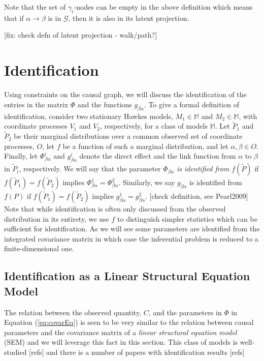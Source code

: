 \documentclass[accepted]{uai2021} %
\begin{document}
Note that the set of $\gamma_i$-nodes can be empty in the above definition 
which means that if $\alpha\rightarrow\beta$ is in $\mathcal{G}$, then it is 
also in its latent projection.

[fix: check defn of latent projection - walk/path?]



\section{Identification}

Using constraints on the causal graph, we will discuss the identification of 
the entries in the 
matrix $\Phi$ and the functions $g_{\beta\alpha}$. To give a formal definition 
of 
identification, consider two stationary Hawkes 
models, $M_1\in\mathbb{M}$ and $M_2\in\mathbb{M}$, with coordinate processes 
$V_1$ and $V_2$, 
respectively, for a class of models $\mathbb{M}$. Let $ \tilde{P}_1$ and $ 
\tilde{P}_2$ be their marginal 
distributions over a common observed set of 
coordinate processes, $O$, let $f$ be a function of 
such a marginal distribution, and let 
$\alpha,\beta\in O$. Finally, let $\Phi_{\beta\alpha}^i$ and 
$g_{\beta\alpha}^i$ 
denote the direct effect and the link function from $\alpha$ to 
$\beta$ in $\tilde{P}_i$, respectively. We will say that the parameter 
$\Phi_{\beta\alpha}$ \emph{is 
identified from} 
$f(\tilde{P})$ if $f(\tilde{P}_1) = f(\tilde{P}_2)$ 
implies $\Phi_{\beta\alpha}^1 = \Phi_{\beta\alpha}^2$. Similarly, we say 
$g_{\beta\alpha}$ is identified from $f(P)$ if $f(\tilde{P}_1) = 
f(\tilde{P}_2)$ 
implies $g_{\beta\alpha}^1 = g_{\beta\alpha}^2$. [check definition, see 
Pearl2009] Note that while identification is often only discussed from the 
observed distribution in its entirety, we use $f$ to distinguish simpler 
statistics which can be sufficient for identification. As we will see some 
parameters are identified from the integrated covariance matrix in which case 
the inferential problem is reduced to a finite-dimensional one.


\subsection{Identification as a Linear Structural Equation Model}

The relation between the observed quantity, $C$, and the parameters in $\Phi$ 
in 
Equation (\ref{eq:covarEq}) is seen to be very similar to the relation between 
causal parameters and the covariance matrix of a \emph{linear structural 
equation model} (SEM) and we will leverage this fact in this section. This 
class of models is well-studied [refs] and there is a number of papers with 
identification results [refs] 
\end{document}
